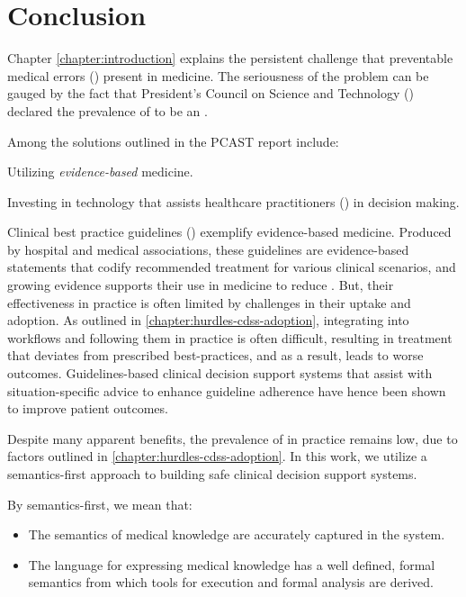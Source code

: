 \chapter{Conclusion}\label{chapter:conclusion}

Chapter \ref{chapter:introduction} explains the persistent challenge
that preventable medical errors (\PMEs{}) present in medicine.
The seriousness of the problem can be gauged by the fact that
President's Council on Science and Technology (\PCAST{})
declared the prevalence of \PMEs{} to be an
.

Among the solutions
outlined in the PCAST{} report include:
\begin{enumerate*}[label=(\roman*)]
  \item Utilizing \emph{evidence-based} medicine.
  \item Investing in technology that assists healthcare
  practitioners (\HCPs{}) in decision making.
\end{enumerate*}
Clinical best practice guidelines (\BPGs{}) exemplify evidence-based medicine.
Produced by hospital and medical associations, these guidelines
are evidence-based statements that codify recommended treatment for
various clinical scenarios, and growing evidence supports their use
in medicine to reduce \PMEs{}. But, their effectiveness in practice is often
limited by challenges in their uptake and adoption. As outlined in
\autoref{chapter:hurdles-cdss-adoption}, integrating \BPGs{} into \HCP{} workflows
and following them in practice is often difficult, resulting in treatment
that deviates from prescribed best-practices, and as a result, leads to
worse outcomes. Guidelines-based clinical decision support systems
that assist \HCPs{} with situation-specific advice to enhance guideline
adherence have hence been shown to improve patient outcomes.

Despite many apparent benefits, the prevalence of \CDSSs{} in practice
remains low, due to factors outlined in \autoref{chapter:hurdles-cdss-adoption}.
In this work, we utilize a semantics-first approach to building safe clinical
decision support systems.

By semantics-first, we mean that:
\begin{itemize}
  \item The semantics of medical knowledge are accurately captured in the
  system.
  \item The language for expressing medical knowledge has a well defined, formal
  semantics from which tools for execution and formal analysis are derived.
\end{itemize}

